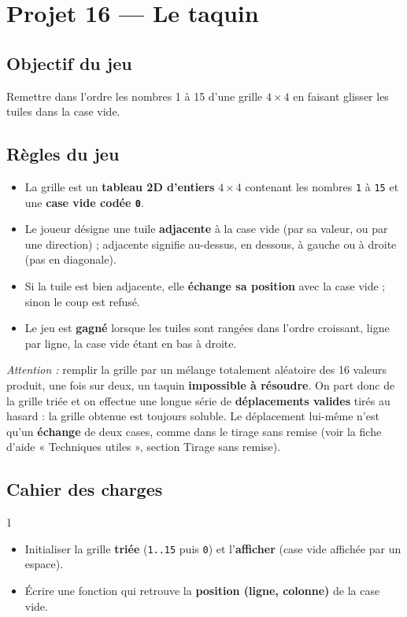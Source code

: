 \section{Projet 16 — Le taquin}

\subsection*{Objectif du jeu}
Remettre dans l'ordre les nombres 1 à 15 d'une grille $4\times4$ en faisant glisser les tuiles dans la case vide.

\subsection*{Règles du jeu}
\begin{itemize}
  \item La grille est un \textbf{tableau 2D d'entiers} $4\times4$ contenant les nombres \texttt{1} à \texttt{15} et une \textbf{case vide codée \texttt{0}}.
  \item Le joueur désigne une tuile \textbf{adjacente} à la case vide (par sa valeur, ou par une direction) ; adjacente signifie au-dessus, en dessous, à gauche ou à droite (pas en diagonale).
  \item Si la tuile est bien adjacente, elle \textbf{échange sa position} avec la case vide ; sinon le coup est refusé.
  \item Le jeu est \textbf{gagné} lorsque les tuiles sont rangées dans l'ordre croissant, ligne par ligne, la case vide étant en bas à droite.
\end{itemize}

\textit{Attention :} remplir la grille par un mélange totalement aléatoire des 16 valeurs produit, une fois sur deux, un taquin \textbf{impossible à résoudre}. On part donc de la grille triée et on effectue une longue série de \textbf{déplacements valides} tirés au hasard : la grille obtenue est toujours soluble. Le déplacement lui-même n'est qu'un \textbf{échange} de deux cases, comme dans le tirage sans remise (voir la fiche d'aide « Techniques utiles », section Tirage sans remise).

\subsection*{Cahier des charges}
\begin{UPSTICahierDesCharges}{1}
\begin{itemize}
  \item Initialiser la grille \textbf{triée} (\texttt{1..15} puis \texttt{0}) et l'\textbf{afficher} (case vide affichée par un espace).
  \item Écrire une fonction qui retrouve la \textbf{position (ligne, colonne)} de la case vide.
\end{itemize}
\end{UPSTICahierDesCharges}

